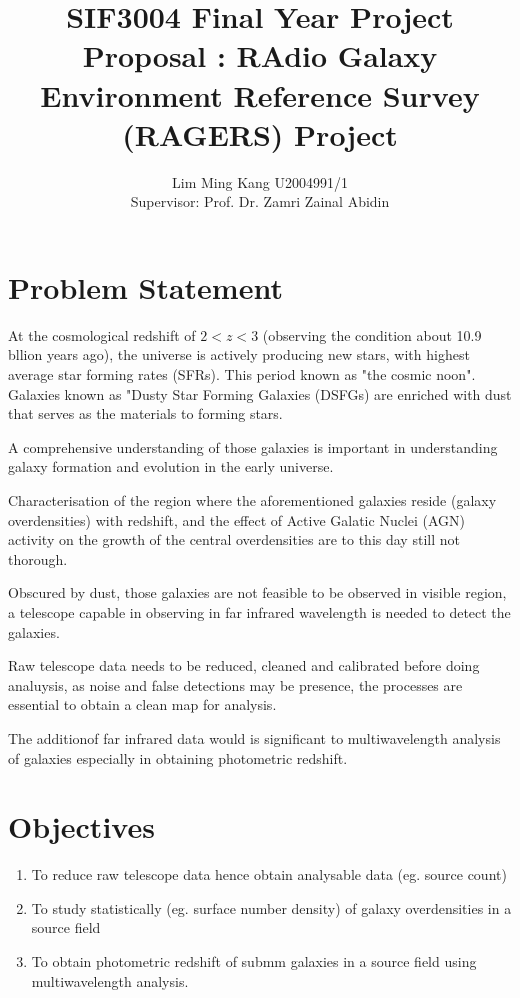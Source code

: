 \documentclass{article}
\title{SIF3004 Final Year Project Proposal : RAdio Galaxy Environment Reference Survey (RAGERS) Project }
\author{Lim Ming Kang U2004991/1\\[0.3cm]{Supervisor: Prof. Dr. Zamri Zainal Abidin}}
\begin{document}
\maketitle
\section{Problem Statement}

At the cosmological redshift of $2 < z < 3$ (observing the condition about 10.9 bllion years ago), the universe is actively producing new stars, with highest average star forming rates (SFRs). This period known as "the cosmic noon"\parencite{Schreiber2020}. Galaxies known as "Dusty Star Forming Galaxies (DSFGs) are enriched with dust that serves as the materials to forming stars.
\medskip

\noindent A comprehensive understanding of those galaxies is important in understanding galaxy formation and evolution in the early universe.\textcite{Geach2016}
\medskip

\noindent Characterisation of the region where the aforementioned galaxies reside (galaxy overdensities) with redshift, and the effect of Active Galatic Nuclei (AGN) activity on the growth of the central overdensities are to this day still not thorough.\parencite{Ragers2021}
\medskip

\noindent Obscured by dust, those galaxies are not feasible to be observed in visible region, a telescope capable in observing in far infrared wavelength is needed to detect the galaxies.
\medskip

\noindent Raw telescope data needs to be reduced, cleaned and calibrated before doing analuysis, as noise and false detections may be presence, the processes are essential to obtain a clean map for analysis. 

\medskip

\noindent The additionof far infrared data would is significant to multiwavelength analysis of galaxies especially in obtaining photometric redshift.

\section{Objectives}
\begin{enumerate}
    \item To reduce raw telescope data hence obtain analysable data (eg. source count)
    \item To study statistically (eg. surface number density) of galaxy overdensities in a source field
    \item To obtain photometric redshift of submm galaxies in a source field using multiwavelength analysis.
\end{enumerate}
\end{document}
